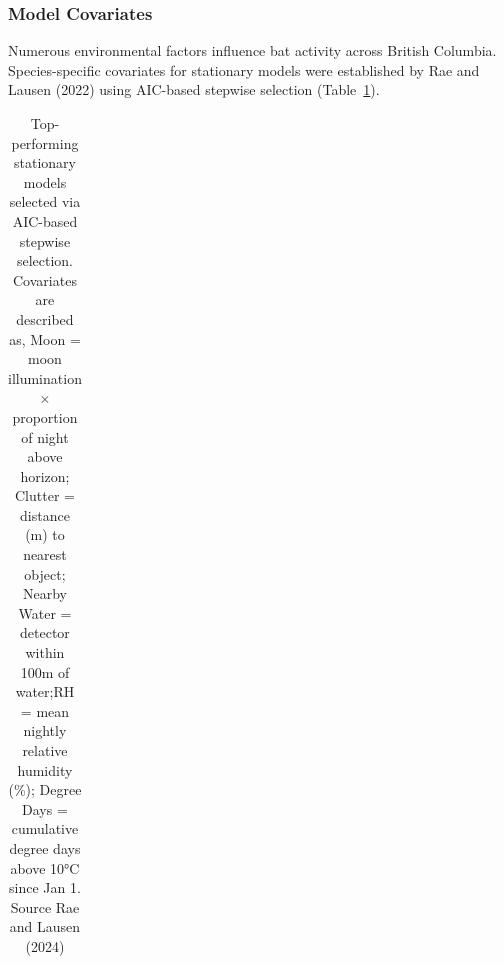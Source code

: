 \documentclass[
  letterpaper,
  DIV=11,
  numbers=noendperiod]{scrartcl}
\begin{document}
\subsubsection{Model Covariates}\label{model-covariates}

Numerous environmental factors influence bat activity across British
Columbia. Species-specific covariates for stationary models were
established by Rae and Lausen (2022) using AIC-based stepwise selection
(Table~\ref{tbl-cov}).

\begin{longtable}[l]{>{\raggedright\arraybackslash}p{15em}>{\raggedright\arraybackslash}p{8em}>{\raggedright\arraybackslash}p{20em}}

\caption{\label{tbl-cov}Top-performing stationary models selected via
AIC-based stepwise selection. Covariates are described as, Moon = moon
illumination × proportion of night above horizon; Clutter = distance (m)
to nearest object; Nearby Water = detector within 100m of water;RH =
mean nightly relative humidity (\%); Degree Days = cumulative degree
days above 10°C since Jan 1. Source Rae and Lausen (2024)}

\tabularnewline


\end{longtable}
\end{document}

